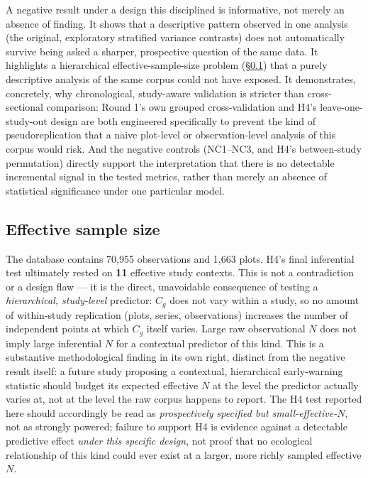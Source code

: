 \documentclass[11pt]{article}
\newcommand{\Cg}{C_g}
\begin{document}
A negative result under a design this disciplined is informative, not
merely an absence of finding. It shows that a descriptive pattern
observed in one analysis (the original, exploratory stratified variance
contrasts) does not automatically survive being asked a sharper, prospective
question of the same data. It highlights a hierarchical effective-sample-size
problem (\S\ref{sec:effectiveN}) that a purely descriptive analysis of the
same corpus could not have exposed. It demonstrates, concretely, why
chronological, study-aware validation is stricter than cross-sectional
comparison: Round 1's own grouped cross-validation and H4's leave-one-study-out
design are both engineered specifically to prevent the kind of
pseudoreplication that a naive plot-level or observation-level analysis of
this corpus would risk. And the negative controls (NC1--NC3, and H4's
between-study permutation) directly support the interpretation that there
is no detectable incremental signal in the tested metrics, rather than
merely an absence of statistical significance under one particular model.

\subsection{Effective sample size}
\label{sec:effectiveN}

The database contains 70{,}955 observations and 1{,}663 plots. H4's final
inferential test ultimately rested on \textbf{11} effective study
contexts. This is not a contradiction or a design flaw --- it is the
direct, unavoidable consequence of testing a \emph{hierarchical,
study-level} predictor: $\Cg$ does not vary within a study, so no amount
of within-study replication (plots, series, observations) increases the
number of independent points at which $\Cg$ itself varies. Large raw
observational $N$ does not imply large inferential $N$ for a contextual
predictor of this kind. This is a substantive methodological finding in
its own right, distinct from the negative result itself: a future study
proposing a contextual, hierarchical early-warning statistic should
budget its expected effective $N$ at the level the predictor actually
varies at, not at the level the raw corpus happens to report. The H4 test
reported here should accordingly be read as \emph{prospectively
specified but small-effective-$N$}, not as strongly powered; failure to
support H4 is evidence against a detectable predictive effect
\emph{under this specific design}, not proof that no ecological
relationship of this kind could ever exist at a larger, more richly
sampled effective $N$.
\end{document}
